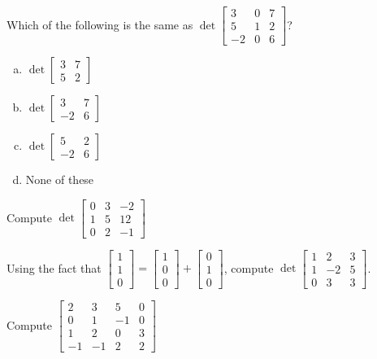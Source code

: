 \begin{applicationActivities}{2}{26}
\begin{activity}{5}
  Which of the following is the same as $\det \begin{bmatrix} 3 & 0 & 7 \\  5 & 1 & 2 \\  -2 & 0 & 6 \end{bmatrix}$?
\begin{enumerate}[(a)]
\item $\det \begin{bmatrix} 3 & 7 \\ 5 & 2 \end{bmatrix}$
\item $\det \begin{bmatrix} 3 & 7 \\ -2 & 6 \end{bmatrix}$
\item $\det \begin{bmatrix} 5 & 2 \\ -2 & 6 \end{bmatrix}$
\item None of these
\end{enumerate}
\end{activity}

\begin{activity}{5}
  Compute $\det \begin{bmatrix} 0 & 3 & -2 \\ 1 & 5 & 12 \\ 0 & 2 & -1 \end{bmatrix}$
\end{activity}

\begin{activity}{10}
   Using the fact that $\begin{bmatrix} 1 \\ 1 \\ 0 \end{bmatrix} = \begin{bmatrix} 1 \\ 0 \\ 0 \end{bmatrix} + \begin{bmatrix} 0 \\ 1 \\ 0 \end{bmatrix}$, compute $\det \begin{bmatrix} 1 & 2 & 3 \\ 1 & -2 & 5 \\ 0 & 3 & 3 \end{bmatrix}$.
\end{activity}

\begin{activity}{10}
   Compute $\begin{bmatrix} 2 & 3 & 5 & 0 \\ 0 & 1 & -1 & 0 \\ 1 & 2 & 0 & 3 \\ -1 & -1 & 2 & 2 \end{bmatrix}$
\end{activity}

\end{applicationActivities}
